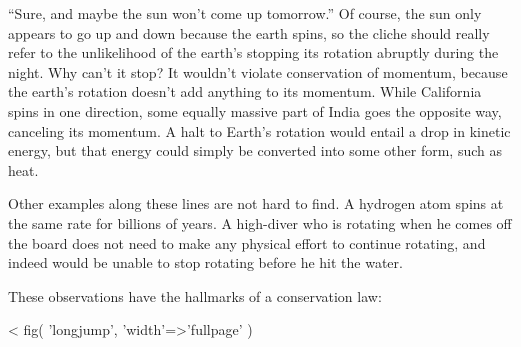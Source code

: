 
``Sure, and maybe the sun won't come up tomorrow.'' Of
course, the sun only appears to go up and down because the
earth spins, so the cliche should really refer to the
unlikelihood of the earth's stopping its rotation abruptly
during the night. Why can't it stop? It wouldn't violate
conservation of momentum, because the earth's rotation
doesn't add anything to its momentum. While California spins
in one direction, some equally massive part of India goes
the opposite way, canceling its momentum. A halt to Earth's
rotation would entail a drop in kinetic energy, but that
energy could simply be converted into some other form, such as heat.

Other examples along these lines are not hard to find. A
hydrogen atom spins at the same rate for billions of years.
A high-diver who is rotating when he comes off the board
does not need to make any physical effort to continue
rotating, and indeed would be unable to stop rotating
before he hit the water.

These observations have the hallmarks of a conservation law:




<%
  fig(
    'longjump',
    {
      'width'=>'fullpage'
    }
  )

